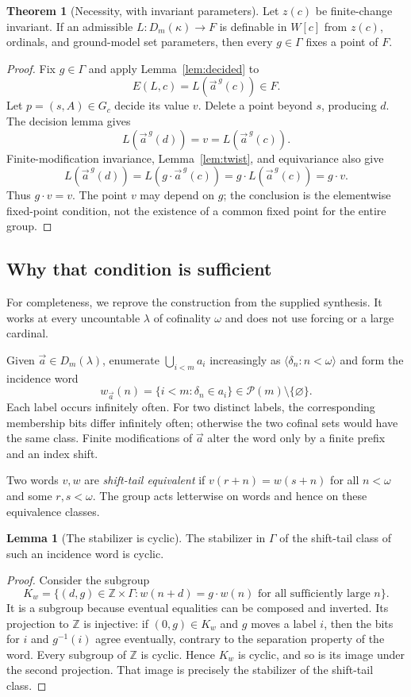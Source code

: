 \documentclass[11pt,letterpaper]{article}
\theoremstyle{definition}
\newtheorem{theorem}[definition]{Theorem}
\newtheorem{lemma}[definition]{Lemma}
\numberwithin{equation}{section}
\newcommand{\Pow}{\mathcal P}
\begin{document}
\begin{theorem}[Necessity, with invariant parameters]\label{thm:necessity}
Let $z(c)$ be finite-change invariant. If an admissible $L:D_m(\kappa)\to F$ is definable in $W[c]$ from $z(c)$, ordinals, and ground-model set parameters, then every $g\in\Gamma$ fixes a point of $F$.
\end{theorem}
\begin{proof}
Fix $g\in\Gamma$ and apply Lemma~\ref{lem:decided} to
\[
 E(L,c)=L(\vec a^{\,g}(c))\in F.
\]
Let $p=(s,A)\in G_c$ decide its value $v$. Delete a point beyond $s$, producing $d$. The decision lemma gives
\[
 L(\vec a^{\,g}(d))=v=L(\vec a^{\,g}(c)).
\]
Finite-modification invariance, Lemma~\ref{lem:twist}, and equivariance also give
\[
 L(\vec a^{\,g}(d))
 =L(g\cdot\vec a^{\,g}(c))
 =g\cdot L(\vec a^{\,g}(c))=g\cdot v.
\]
Thus $g\cdot v=v$. The point $v$ may depend on $g$; the conclusion is the elementwise fixed-point condition, not the existence of a common fixed point for the entire group.
\end{proof}

\subsection{Why that condition is sufficient}

For completeness, we reprove the construction from the supplied synthesis. It works at every uncountable $\lambda$ of cofinality $\omega$ and does not use forcing or a large cardinal.

Given $\vec a\in D_m(\lambda)$, enumerate $\bigcup_{i<m}a_i$ increasingly as $\langle\delta_n:n<\omega\rangle$ and form the incidence word
\[
 w_{\vec a}(n)=\{i<m:\delta_n\in a_i\}\in\Pow(m)\setminus\{\varnothing\}.
\]
Each label occurs infinitely often. For two distinct labels, the corresponding membership bits differ infinitely often; otherwise the two cofinal sets would have the same class. Finite modifications of $\vec a$ alter the word only by a finite prefix and an index shift.

Two words $v,w$ are \emph{shift-tail equivalent} if $v(r+n)=w(s+n)$ for all $n<\omega$ and some $r,s<\omega$. The group acts letterwise on words and hence on these equivalence classes.

\begin{lemma}[The stabilizer is cyclic]\label{lem:cyclicnew}
The stabilizer in $\Gamma$ of the shift-tail class of such an incidence word is cyclic.
\end{lemma}
\begin{proof}
Consider the subgroup
\[
 K_w=\{(d,g)\in\mathbb Z\times\Gamma:
       w(n+d)=g\cdot w(n)\text{ for all sufficiently large }n\}.
\]
It is a subgroup because eventual equalities can be composed and inverted. Its projection to $\mathbb Z$ is injective: if $(0,g)\in K_w$ and $g$ moves a label $i$, then the bits for $i$ and $g^{-1}(i)$ agree eventually, contrary to the separation property of the word. Every subgroup of $\mathbb Z$ is cyclic. Hence $K_w$ is cyclic, and so is its image under the second projection. That image is precisely the stabilizer of the shift-tail class.
\end{proof}
\end{document}
